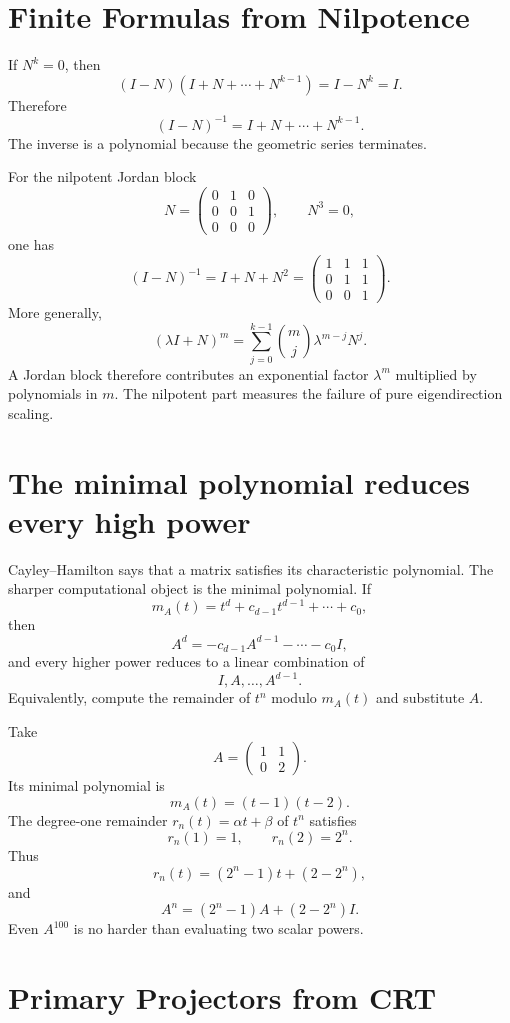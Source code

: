 \section{Finite Formulas from Nilpotence}

If \(N^k=0\), then
\[
  (I-N)(I+N+\cdots+N^{k-1})=I-N^k=I.
\]
Therefore
\[
  \boxed{
  (I-N)^{-1}=I+N+\cdots+N^{k-1}.}
\]
The inverse is a polynomial because the geometric series terminates.

For the nilpotent Jordan block
\[
  N=
  \begin{pmatrix}
    0&1&0\\
    0&0&1\\
    0&0&0
  \end{pmatrix},
  \qquad N^3=0,
\]
one has
\[
  (I-N)^{-1}=I+N+N^2
  =
  \begin{pmatrix}
    1&1&1\\
    0&1&1\\
    0&0&1
  \end{pmatrix}.
\]
More generally,
\[
  (\lambda I+N)^m
  =\sum_{j=0}^{k-1}
  \binom mj\lambda^{m-j}N^j.
\]
A Jordan block therefore contributes an exponential factor \(\lambda^m\) multiplied by polynomials in \(m\).  The nilpotent part measures the failure of pure eigendirection scaling.

\section{The minimal polynomial reduces every high power}

Cayley--Hamilton says that a matrix satisfies its characteristic polynomial.  The sharper computational object is the minimal polynomial.  If
\[
  m_A(t)=t^d+c_{d-1}t^{d-1}+\cdots+c_0,
\]
then
\[
  A^d=-c_{d-1}A^{d-1}-\cdots-c_0I,
\]
and every higher power reduces to a linear combination of
\[
  I,A,\ldots,A^{d-1}.
\]
Equivalently, compute the remainder of \(t^n\) modulo \(m_A(t)\) and substitute \(A\).

Take
\[
  A=
  \begin{pmatrix}
    1&1\\
    0&2
  \end{pmatrix}.
\]
Its minimal polynomial is
\[
  m_A(t)=(t-1)(t-2).
\]
The degree-one remainder \(r_n(t)=\alpha t+\beta\) of \(t^n\) satisfies
\[
  r_n(1)=1,
  \qquad
  r_n(2)=2^n.
\]
Thus
\[
  r_n(t)=(2^n-1)t+(2-2^n),
\]
and
\[
  \boxed{
  A^n=(2^n-1)A+(2-2^n)I.}
\]
Even \(A^{100}\) is no harder than evaluating two scalar powers.

\section{Primary Projectors from CRT}

